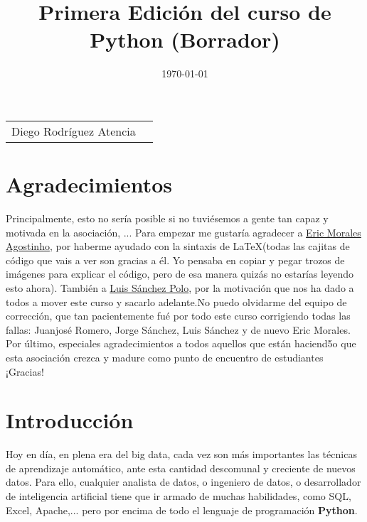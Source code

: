\documentclass{article}
\title{Primera Edición del curso de Python (Borrador)}
\date{\today}
\author{}
\begin{document}
\maketitle

\begin{center}
    \vspace{20mm}
    \vspace{20mm}
    
    \begin{tabular}{cc}
        Diego Rodríguez Atencia
    \end{tabular}
\end{center}

\newpage
\tableofcontents
\setlength{\parskip}{4mm}

\newpage
\section{Agradecimientos}

Principalmente, esto no sería posible si no tuviésemos a gente tan capaz y motivada en la asociación, ... Para empezar me gustaría agradecer a \href{https://www.linkedin.com/in/ericmorag/}{Eric Morales Agostinho}, por haberme ayudado con la sintaxis de \LaTeX (todas las cajitas de código que vais a ver son gracias a él. Yo pensaba en copiar y pegar trozos de imágenes para explicar el código, pero de esa manera quizás no estarías leyendo esto ahora). También a \href{mailto:luissanchezpolo15@gmail.com}{Luis Sánchez Polo}, por la motivación que nos ha dado a todos a mover este curso y sacarlo adelante.No puedo olvidarme del equipo de corrección, que tan pacientemente fué por todo este curso corrigiendo todas las fallas: Juanjosé Romero, Jorge Sánchez, Luis Sánchez y de nuevo Eric Morales. Por último, especiales agradecimientos a todos aquellos que están haciend5o que esta asociación crezca y madure como punto de encuentro de estudiantes ¡Gracias!

\section{Introducción}
Hoy en día, en plena era del big data, cada vez son más importantes las técnicas de aprendizaje automático, ante esta cantidad descomunal y creciente de nuevos datos. Para ello, cualquier analista de datos, o ingeniero de datos, o desarrollador de inteligencia artificial tiene que ir armado de muchas habilidades, como SQL, Excel, Apache,... pero por encima de todo el lenguaje de programación \textbf{Python}.
\end{document}
